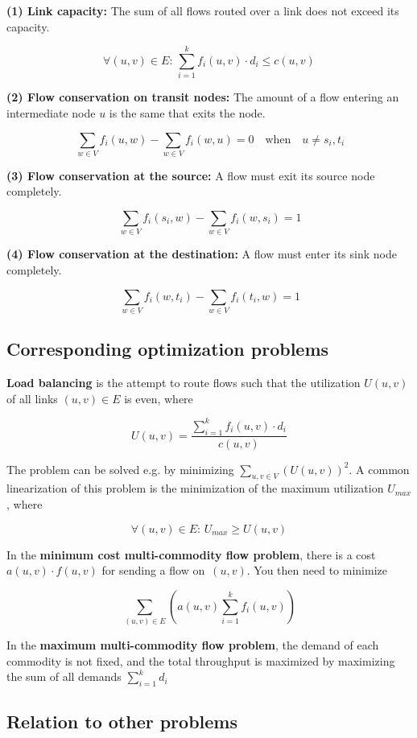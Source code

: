 \textbf{(1) Link capacity:} The sum of all flows routed over a link does
not exceed its capacity.

\[\forall (u,v)\in E:\,\sum_{i=1}^{k} f_i(u,v)\cdot d_i \leq c(u,v)\]

\textbf{(2) Flow conservation on transit nodes:} The amount of a flow
entering an intermediate node \(u\) is the same that exits the node.

\[\,\sum_{w \in V} f_i(u,w) - \sum_{w \in V} f_i(w,u) = 0 \quad \mathrm{when} \quad u \neq s_i, t_i\]

\textbf{(3) Flow conservation at the source:} A flow must exit its
source node completely.

\[\,\sum_{w \in V} f_i(s_i,w) - \sum_{w \in V} f_i(w,s_i) = 1\]

\textbf{(4) Flow conservation at the destination:} A flow must enter its
sink node completely.

\[\,\sum_{w \in V} f_i(w,t_i) - \sum_{w \in V} f_i(t_i,w) = 1\]

\hypertarget{corresponding-optimization-problems}{%
\subsection{Corresponding optimization
problems}\label{corresponding-optimization-problems}}

\textbf{Load balancing} is the attempt to route flows such that the
utilization \(U(u,v)\) of all links \((u,v)\in E\) is even, where

\[U(u,v)=\frac{\sum_{i=1}^{k} f_i(u,v)\cdot d_i}{c(u,v)}\]

The problem can be solved e.g. by minimizing
\(\sum_{u,v\in V} (U(u,v))^2\). A common linearization of this problem
is the minimization of the maximum utilization \(U_{max}\), where

\[\forall (u,v)\in E:\, U_{max} \geq U(u,v)\]

In the \textbf{minimum cost multi-commodity flow problem}, there is a
cost \(a(u,v) \cdot f(u,v)\) for sending a flow on \(\,(u,v)\). You then
need to minimize

\[\sum_{(u,v) \in E} \left( a(u,v) \sum_{i=1}^{k} f_i(u,v) \right)\]

In the \textbf{maximum multi-commodity flow problem}, the demand of each
commodity is not fixed, and the total throughput is maximized by
maximizing the sum of all demands \(\sum_{i=1}^{k} d_i\)

\hypertarget{relation-to-other-problems}{%
\subsection{Relation to other
problems}\label{relation-to-other-problems}}

